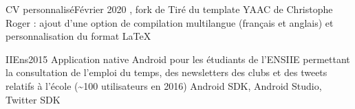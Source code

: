 %
%
%


\begin{projects}

    \project
    {CV personnalisé}{Février 2020}
    {, fork de }
    {Tiré du template YAAC de Christophe Roger : ajout d'une option de compilation multilangue (français et anglais) et personnalisation du format}
    {\LaTeX}

	\project
	{IIEns}{2015}
	{}
	{Application native Android pour les étudiants de l'ENSIIE permettant la consultation de l'emploi du temps, des newsletters des clubs et des tweets relatifs à l'école (\textasciitilde100 utilisateurs en 2016)}
	{Android SDK, Android Studio, Twitter SDK}

\end{projects}